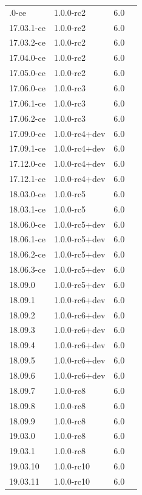 \documentclass[12pt]{report}
\newcommand{\cmark}{\ding{51}} %
\begin{document}
\begin{doublespace}
{\begin{longtable}{|p{4cm}|p{3cm}||p{3cm}|p{2cm}|}
\hline
\endlastfoot
17.03.0-ce & 1.0.0-rc2 & 6.0 & \cmark \\
17.03.1-ce & 1.0.0-rc2 & 6.0 & \cmark \\
17.03.2-ce & 1.0.0-rc2 & 6.0 & \cmark \\
17.04.0-ce & 1.0.0-rc2 & 6.0 & \cmark \\
17.05.0-ce & 1.0.0-rc2 & 6.0 & \cmark \\
17.06.0-ce & 1.0.0-rc3 & 6.0 & \cmark \\
17.06.1-ce & 1.0.0-rc3 & 6.0 & \cmark \\
17.06.2-ce & 1.0.0-rc3 & 6.0 & \cmark \\
17.09.0-ce & 1.0.0-rc4+dev & 6.0 & \cmark \\
17.09.1-ce & 1.0.0-rc4+dev & 6.0 & \cmark \\
17.12.0-ce & 1.0.0-rc4+dev & 6.0 & \cmark \\
17.12.1-ce & 1.0.0-rc4+dev & 6.0 & \cmark \\
18.03.0-ce & 1.0.0-rc5 & 6.0 & \cmark \\
18.03.1-ce & 1.0.0-rc5 & 6.0 & \cmark \\
18.06.0-ce & 1.0.0-rc5+dev & 6.0 & \cmark \\
18.06.1-ce & 1.0.0-rc5+dev & 6.0 & \cmark \\
18.06.2-ce & 1.0.0-rc5+dev & 6.0 & \cmark \\
18.06.3-ce & 1.0.0-rc5+dev & 6.0 & \cmark \\
18.09.0 & 1.0.0-rc5+dev & 6.0 & \cmark \\
18.09.1 & 1.0.0-rc6+dev & 6.0 & \cmark \\
18.09.2 & 1.0.0-rc6+dev & 6.0 & \cmark \\
18.09.3 & 1.0.0-rc6+dev & 6.0 & \cmark \\
18.09.4 & 1.0.0-rc6+dev & 6.0 & \cmark \\
18.09.5 & 1.0.0-rc6+dev & 6.0 & \cmark \\
18.09.6 & 1.0.0-rc6+dev & 6.0 & \cmark \\
18.09.7 & 1.0.0-rc8 & 6.0 & \cmark \\
18.09.8 & 1.0.0-rc8 & 6.0 & \cmark \\
18.09.9 & 1.0.0-rc8 & 6.0 & \cmark \\
19.03.0 & 1.0.0-rc8 & 6.0 & \cmark \\
19.03.1 & 1.0.0-rc8 & 6.0 & \cmark \\
19.03.10 & 1.0.0-rc10 & 6.0 & \cmark \\
19.03.11 & 1.0.0-rc10 & 6.0 & \cmark \\

\end{longtable}}
\end{doublespace}
\end{document}

